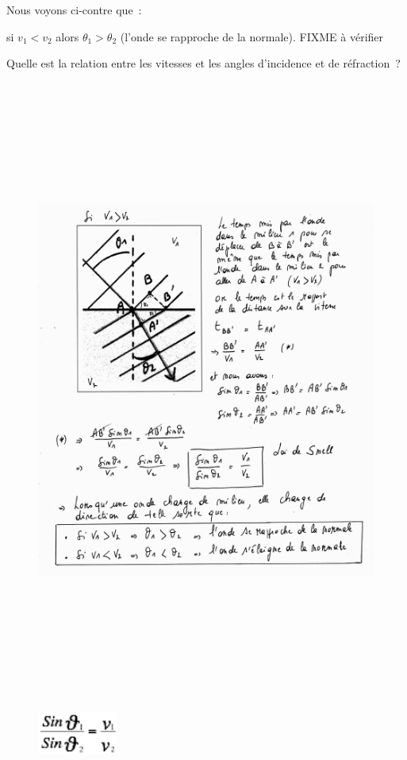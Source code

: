 Nous voyons ci-contre que~:

si $v_1 < v_2$ alors $\theta_1 >  \theta_2$ (l'onde se rapproche de la normale).
FIXME à vérifier

Quelle est la relation entre les vitesses et les angles d'incidence et
de réfraction~?

\begin{figure}
\centering
\includegraphics[width=18.516cm,height=20.461cm]{Pictures/10000001000013080000150A74E0EE61F2B1EE2F.png}
\caption{}
\end{figure}

\begin{figure}
\centering
\includegraphics[width=2.634cm,height=1.412cm]{Pictures/1000000100000045000000258E7A9DA5E900B5EA.png}
\caption{}
\end{figure}

